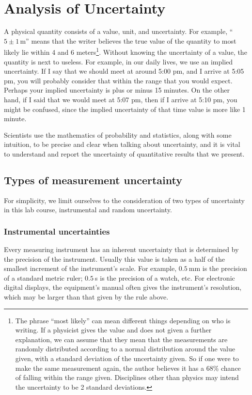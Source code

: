 \chapter{Analysis of Uncertainty}

A physical quantity consists of a value, unit, and uncertainty.
For example, ``$5 \pm 1\,$m'' means that the writer believes the true value of the quantity to most likely lie within 4 and 6 meters\footnote{The phrase ``most likely'' can mean different things depending on who is writing.
	If a physicist gives the value and does not given a further explanation, we can assume that they mean that the measurements are randomly distributed according to a normal distribution around the value given, with a standard deviation of the uncertainty given.
	So if one were to make the same measurement again, the author believes it has a 68\% chance of falling within the range given.
	Disciplines other than physics may intend the uncertainty to be 2 standard deviations.}.
Without knowing the uncertainty of a value, the quantity is next to useless.
For example, in our daily lives, we use an implied uncertainty.
If I say that we should meet at around 5:00 pm, and I arrive at 5:05 pm, you will probably consider that within the range that you would expect.
Perhaps your implied uncertainty is plus or minus 15 minutes.
On the other hand, if I said that we would meet at 5:07 pm, then if I arrive at 5:10 pm, you might be confused, since the implied uncertainty of that time value is more like 1 minute.

Scientists use the mathematics of probability and statistics, along with some intuition, to be precise and clear when talking about uncertainty, and it is vital to understand and report the uncertainty of quantitative results that we present.

\section{Types of measurement uncertainty}

For simplicity, we limit ourselves to the consideration of two types of uncertainty in this lab course, instrumental and random uncertainty.

\subsection{Instrumental uncertainties}

Every measuring instrument has an inherent uncertainty that is determined by the precision	
  of the instrument.
Usually this value is taken as a half of the smallest increment of the instrument's scale. For example, $0.5\:$mm is the precision of a standard metric ruler; $0.5\:$s is the precision of a watch, etc. For electronic digital displays, the equipment's manual often gives the instrument's resolution, which may be larger than that given by the rule above.

